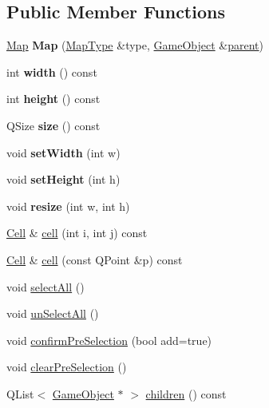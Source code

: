 \subsection*{\-Public \-Member \-Functions}
\begin{DoxyCompactItemize}
\item 
\hypertarget{class_map_a309fe60658ede796d53d9df6752da597}{\hyperlink{class_map}{\-Map} {\bfseries \-Map} (\hyperlink{class_map_type}{\-Map\-Type} \&type, \hyperlink{class_game_object}{\-Game\-Object} \&\hyperlink{class_game_object_af3deaf39cde23c189765634e32e95bb4}{parent})}\label{class_map_a309fe60658ede796d53d9df6752da597}

\item 
\hypertarget{class_map_a4c35169a60acd3669f198e6c2d20dff5}{int {\bfseries width} () const }\label{class_map_a4c35169a60acd3669f198e6c2d20dff5}

\item 
\hypertarget{class_map_a009f197c2e488d8dd5f02b1a2920a15c}{int {\bfseries height} () const }\label{class_map_a009f197c2e488d8dd5f02b1a2920a15c}

\item 
\hypertarget{class_map_a028c347d88716e984c943f382f58b7ef}{\-Q\-Size {\bfseries size} () const }\label{class_map_a028c347d88716e984c943f382f58b7ef}

\item 
\hypertarget{class_map_a2915ccde4d8a2ba8142677baea803467}{void {\bfseries set\-Width} (int w)}\label{class_map_a2915ccde4d8a2ba8142677baea803467}

\item 
\hypertarget{class_map_affab3537641a7985559f83ea083e00ca}{void {\bfseries set\-Height} (int h)}\label{class_map_affab3537641a7985559f83ea083e00ca}

\item 
\hypertarget{class_map_a5f7c31af6620d00ce8a812c8710345ab}{void {\bfseries resize} (int w, int h)}\label{class_map_a5f7c31af6620d00ce8a812c8710345ab}

\item 
\hyperlink{class_cell}{\-Cell} \& \hyperlink{class_map_a6c94b3e99490efa0f170db132dc9f5b8}{cell} (int i, int j) const 
\item 
\hyperlink{class_cell}{\-Cell} \& \hyperlink{class_map_ae0b03b422a10edbfa7bd0b4bdd085793}{cell} (const \-Q\-Point \&p) const 
\item 
void \hyperlink{class_map_a16aea6b5c9de3a26b094d964885b33b7}{select\-All} ()
\item 
void \hyperlink{class_map_a5b85190575503a09c5c6de012da64f7c}{un\-Select\-All} ()
\item 
void \hyperlink{class_map_a89cab58d82e08dacfe0b97899bab5501}{confirm\-Pre\-Selection} (bool add=true)
\item 
void \hyperlink{class_map_a0a637f44f0a59c3a67b6a507ae710c7f}{clear\-Pre\-Selection} ()
\item 
\-Q\-List$<$ \hyperlink{class_game_object}{\-Game\-Object} $\ast$ $>$ \hyperlink{class_map_a939817aa7f5c9e81d3d2b1a42d9403e7}{children} () const 
\end{DoxyCompactItemize}


